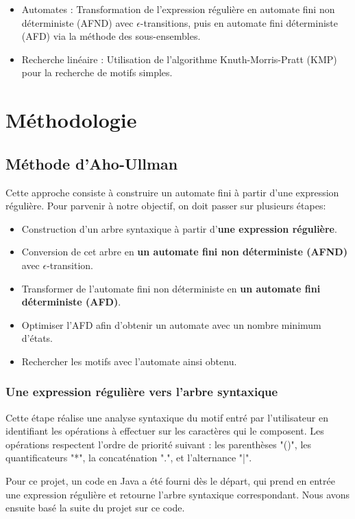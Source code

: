 \documentclass{article}
\begin{document}
\begin{itemize}
    \item Automates : Transformation de l'expression régulière en automate fini non déterministe (AFND) avec $\epsilon$-transitions, puis en automate fini déterministe (AFD) via la méthode des sous-ensembles.
    \item Recherche linéaire : Utilisation de l'algorithme Knuth-Morris-Pratt (KMP) pour la recherche de motifs simples.
\end{itemize}

\section{Méthodologie}
\subsection{Méthode d’Aho-Ullman}
Cette approche consiste à construire un automate fini à partir d’une expression régulière. Pour parvenir à notre objectif, on doit passer sur plusieurs étapes:
\begin{itemize}
    \item Construction d'un arbre syntaxique à partir d’\textbf{une expression régulière}.
    \item Conversion de cet arbre en \textbf{un automate fini non déterministe (AFND)} avec $\epsilon$-transition.
    \item Transformer de l’automate fini non déterministe en \textbf{un automate fini déterministe (AFD)}.
    \item Optimiser l’AFD afin d’obtenir un automate avec un nombre minimum d’états.
    \item Rechercher les motifs avec l’automate ainsi obtenu.
\end{itemize}

\subsubsection{Une expression régulière vers l’arbre syntaxique}
Cette étape réalise une analyse syntaxique du motif entré par l'utilisateur en identifiant les opérations à effectuer sur les caractères qui le composent. Les opérations respectent l'ordre de priorité suivant : les parenthèses "()", les quantificateurs "*", la concaténation ".", et l'alternance "|".

Pour ce projet, un code en Java a été fourni dès le départ, qui prend en entrée une expression régulière et retourne l'arbre syntaxique correspondant. Nous avons ensuite basé la suite du projet sur ce code.
\end{document}
